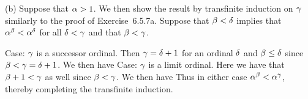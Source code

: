 \begin{solution}
    (b) Suppose that $\alpha > 1$.
    We then show the result by transfinite induction on $\gamma$ similarly to the proof of Exercise~6.5.7a.
    Suppose that $\beta < \delta$ implies that $\alpha^\beta < \alpha^\delta$ for all $\delta < \gamma$ and that $\beta < \gamma$.

    Case: $\gamma$ is a successor ordinal.
    Then $\gamma = \delta + 1$ for an ordinal $\delta$ and $\beta \leq \delta$ since $\beta < \gamma = \delta + 1$.
    We then have
    Case: $\gamma$ is a limit ordinal.
    Here we have that $\beta+1 < \gamma$ as well since $\beta < \gamma$.
    We then have
    Thus in either case $\alpha^\beta < \alpha^\gamma$, thereby completing the transfinite induction. \qedsymbol
\end{solution}

\def\ex{6.5.15}
\setcounter{itm}{0}
\question{\ex}

